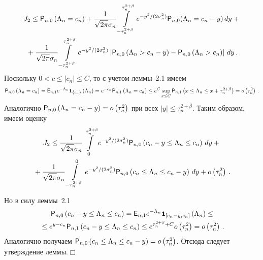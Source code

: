 \noindent
\begin{multline*}
J_2\leq{{\sf P}}_{n,0}\left(\Lambda_n=c_n\right)+\displaystyle\frac{\displaystyle 1\mathstrut}{\displaystyle \sqrt{2\pi}\sigma_n\mathstrut}\int\limits_{-\tau_n^{2+\beta}}^{\tau_n^{2+\beta}}
e^{-y^2/(2\sigma_n^2)}{{\sf P}}_{n,0}(\Lambda_n=c_n-y)\,dy+{}\\
{}+
\displaystyle\frac{\displaystyle 1\mathstrut}{\displaystyle \sqrt{2\pi}\sigma_n\mathstrut}\int\limits_{-\tau_n^{2+\beta}}^{\tau_n^{2+\beta}}
e^{-{y^2}/(2\sigma_n^2)}\left | {{\sf P}}_{n,0}\left(\Lambda_n>c_n-y\right) - {{\sf P}}_{n,0}\left(\Lambda_n>c_n\right) \right |\,dy\,.
\end{multline*}
Поскольку $0<c\leq|c_n|\leq C$, то с учетом леммы~2.1 имеем
\begin{equation*}
{{\sf P}}_{n,0}\left(\Lambda_n=c_n\right)={{\sf E}}_{n,1}e^{-\Lambda_n}{\mbox{{\small \tt {1}}\hspace{-1.5mm}{\tt 1}}}_{\{c_n\}}
\left(\Lambda_n\right)=e^{-c_n}{{\sf P}}_{n,1}\left(\Lambda_n=c_n\right)
\leq e^C\sup_{x\leq C}{{\sf P}}_{n,1}\left(x\leq\Lambda_n\leq x+\tau_n^{2+\beta}\right)= o\left(\tau_n^2\right)\,.
\end{equation*}
Аналогично ${{\sf P}}_{n,0}\left(\Lambda_n=c_n-y\right)= o\left(\tau_n^2\right)$ при всех $|y|\leq\tau_n^{2+\beta}$.
Таким образом, имеем оценку
\begin{multline*}
J_2\leq\displaystyle\frac{\displaystyle 1\mathstrut}{\displaystyle \sqrt{2\pi}\sigma_n\mathstrut}\int\limits_{0}^{\tau_n^{2+\beta}}
e^{-{y^2}/(2\sigma_n^2)}{{\sf P}}_{n,0}\left(c_n-y\leq\Lambda_n\leq c_n\right)\,dy+{}\\
{}
+\displaystyle\frac{\displaystyle 1\mathstrut}{\displaystyle \sqrt{2\pi}\sigma_n\mathstrut}\int\limits_{-\tau_n^{2+\beta}}^{0}
e^{-{y^2}/(2\sigma_n^2)}{{\sf P}}_{n,0}\left(c_n\leq\Lambda_n\leq c_n-y\right)\,dy+ o\left(\tau_n^2\right)\,.
\end{multline*}

\vspace*{-6pt}

\noindent
Но в силу леммы~2.1
\begin{multline*}
{{\sf P}}_{n,0}\left(c_n-y\leq\Lambda_n\leq c_n\right)={{\sf E}}_{n,1}e^{-\Lambda_n}{\mbox{{\small \tt {1}}\hspace{-1.5mm}{\tt 1}}}_{\left[c_n-y,c_n\right]}
\left(\Lambda_n\right)\leq
\\
{}
\leq e^{y-c_n}{{\sf P}}_{n,1}\left(c_n-y\leq\Lambda_n\leq c_n\right)\leq e^{\tau_n^{2+\beta}+C} o\left(\tau_n^2\right)=
 o\left(\tau_n^2\right)\,.
\end{multline*}
Аналогично получаем
${{\sf P}}_{n,0}\left(c_n\leq\Lambda_n\leq c_n-y\right)= o\left(\tau_n^2\right)$.
Отсюда следует утверждение леммы.\hfill$\Box$



